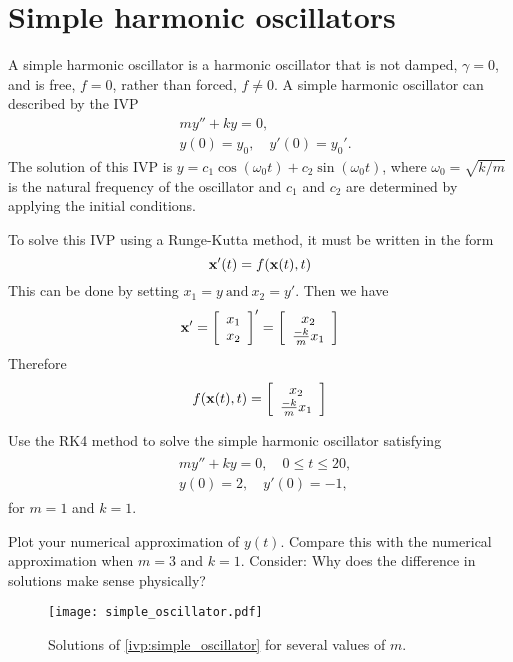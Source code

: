 \section*{Simple harmonic oscillators}
A simple harmonic oscillator is a harmonic oscillator that is not damped, $\gamma =0$, and is free, $f = 0$, rather than forced, $f \not = 0$. 
A simple harmonic oscillator can described by the IVP
\begin{align*}
&{}my'' + ky = 0,\\
&{}y(0) = y_0,\quad
y'(0) = y_0'.
\end{align*}
The solution of this IVP is $y = c_1\cos (\omega_0 t) + c_2 \sin (\omega_0 t)$, where $\omega_0 = \sqrt{k/m}$ is the natural frequency of the oscillator and $c_1$ and $c_2$ are determined by applying the initial conditions.

To solve this IVP using a Runge-Kutta method, it must be written in the form
\[\mathbf{x}'(t) = f(\mathbf{x}(t),t) \]
This can be done by setting $x_1 = y \ \text{and} \ x_2 = y'$. Then we have \[     \mathbf{x}'=
 \left[\begin{array}{c}x_1 \\x_2\end{array}\right]'  =  \left[\begin{array}{c}x_2 \\\frac{-k}{m}x_1\end{array}\right]\]
Therefore$$f(\mathbf{x}(t),t) = \left[\begin{array}{c}x_2 \\\frac{-k}{m}x_1\end{array}\right]$$

\begin{problem} Use the RK4 method to solve the simple harmonic oscillator satisfying 
\begin{align}
	\begin{split}
&{}my'' + ky = 0,\quad 0 \leq t \leq 20, \\
&{}y(0) = 2, \quad
y'(0) = -1,
	\end{split}
	\label{ivp:simple_oscillator}
\end{align}
for $m = 1$ and $k =1$.

Plot your numerical approximation of $y(t)$.  
Compare this with the numerical approximation when $m = 3$ and $k =1$. Consider: Why does the difference in solutions make sense physically?
\end{problem}


\begin{figure}[H]
\centering
\texttt{[image: simple\_oscillator.pdf]}
\caption{Solutions of \eqref{ivp:simple_oscillator} for several values of $m$.}
\label{ivp:simple_oscillator_figure}
\end{figure}


